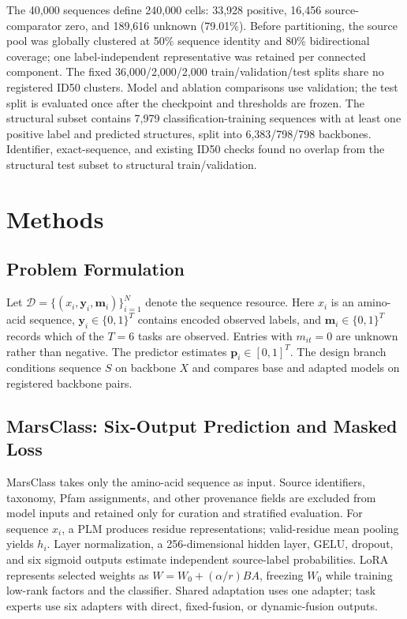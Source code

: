 \documentclass[conference]{IEEEtran}
\begin{document}
The 40,000 sequences define 240,000 cells: 33,928 positive, 16,456 source-comparator zero, and 189,616 unknown (79.01\%). Before partitioning, the source pool was globally clustered at 50\% sequence identity and 80\% bidirectional coverage; one label-independent representative was retained per connected component. The fixed 36,000/2,000/2,000 train/validation/test splits share no registered ID50 clusters. Model and ablation comparisons use validation; the test split is evaluated once after the checkpoint and thresholds are frozen. The structural subset contains 7,979 classification-training sequences with at least one positive label and predicted structures, split into 6,383/798/798 backbones. Identifier, exact-sequence, and existing ID50 checks found no overlap from the structural test subset to structural train/validation.

\section{Methods}\label{sec:method}

\subsection{Problem Formulation}
Let $\mathcal{D}=\{(x_i,\mathbf{y}_i,\mathbf{m}_i)\}_{i=1}^N$ denote the sequence resource. Here $x_i$ is an amino-acid sequence, $\mathbf{y}_i\in\{0,1\}^T$ contains encoded observed labels, and $\mathbf{m}_i\in\{0,1\}^T$ records which of the $T=6$ tasks are observed. Entries with $m_{it}=0$ are unknown rather than negative. The predictor estimates $\mathbf{p}_i\in[0,1]^T$. The design branch conditions sequence $S$ on backbone $X$ and compares base and adapted models on registered backbone pairs.

\subsection{MarsClass: Six-Output Prediction and Masked Loss}
MarsClass takes only the amino-acid sequence as input. Source identifiers, taxonomy, Pfam assignments, and other provenance fields are excluded from model inputs and retained only for curation and stratified evaluation. For sequence $x_i$, a PLM produces residue representations; valid-residue mean pooling yields $h_i$. Layer normalization, a 256-dimensional hidden layer, GELU, dropout, and six sigmoid outputs estimate independent source-label probabilities. LoRA represents selected weights as $W=W_0+(\alpha/r)BA$, freezing $W_0$ while training low-rank factors and the classifier. Shared adaptation uses one adapter; task experts use six adapters with direct, fixed-fusion, or dynamic-fusion outputs.
\end{document}
